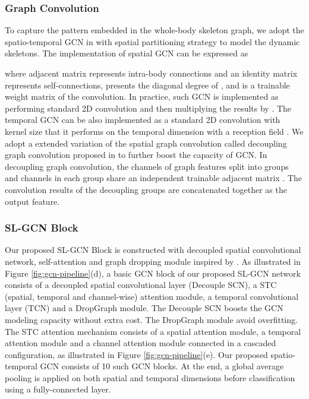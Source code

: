 \documentclass[final]{cvpr}
\begin{document}
\subsubsection{Graph Convolution}
To capture the pattern embedded in the whole-body skeleton graph, we adopt the spatio-temporal GCN in \cite{yan2018spatial} with spatial partitioning strategy to model the dynamic skeletons. The implementation of spatial GCN can be expressed as

where adjacent matrix  represents intra-body connections and an identity matrix  represents self-connections,  presents the diagonal degree of , and  is a trainable weight matrix of the convolution. In practice, such GCN is implemented as performing standard 2D convolution and then multiplying the results by . The temporal GCN can be also implemented as a standard 2D convolution with kernel size  that it performs on the temporal dimension with a reception field . 
We adopt a extended variation of the spatial graph convolution called decoupling graph convolution proposed in \cite{chengdecoupling} to further boost the capacity of GCN. In decoupling graph convolution, the channels of graph features split into  groups and channels in each group share an independent trainable adjacent matrix . The convolution results of the decoupling groups are concatenated together as the output feature. 



\subsubsection{SL-GCN Block}
Our proposed SL-GCN Block is constructed with decoupled spatial convolutional network, self-attention and graph dropping module inspired by \cite{shi2020skeleton,chengdecoupling}. As illustrated in Figure \ref{fig:gcn-pipeline}(d), a basic GCN block of our proposed SL-GCN network consists of a decoupled spatial convolutional layer (Decouple SCN), a STC (spatial, temporal and channel-wise) attention module, a temporal convolutional layer (TCN) and a DropGraph module. The Decouple SCN boosts the GCN modeling capacity without extra cost. The DropGraph module avoid overfitting. The STC attention mechanism consists of a spatial attention module, a temporal attention module and a channel attention module connected in a cascaded configuration, as illustrated in Figure \ref{fig:gcn-pipeline}(e). Our proposed spatio-temporal GCN consists of 10 such GCN blocks. At the end, a global average pooling is applied on both spatial and temporal dimensions before classification using a fully-connected layer. 
\end{document}
